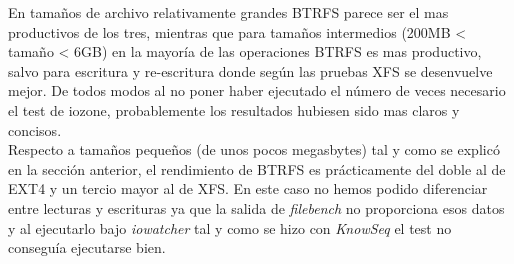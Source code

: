 En tamaños de archivo relativamente grandes BTRFS parece ser el mas productivos de los tres, mientras que para tamaños intermedios (200MB < tamaño < 6GB) en la mayoría de las operaciones BTRFS es mas productivo, salvo para escritura y re-escritura donde según las pruebas XFS se desenvuelve mejor. De todos modos al no poner haber ejecutado el número de veces necesario el test de iozone, probablemente los resultados hubiesen sido mas claros y concisos.\\

Respecto a tamaños pequeños (de unos pocos megasbytes) tal y como se explicó en la sección anterior, el rendimiento de BTRFS es prácticamente del doble al de EXT4 y un tercio mayor al de XFS. En este caso no hemos podido diferenciar entre lecturas y escrituras ya que la salida de \textit{filebench} no proporciona esos datos y al ejecutarlo bajo \textit{iowatcher} tal y como se hizo con \textit{KnowSeq} el test no conseguía ejecutarse bien.

